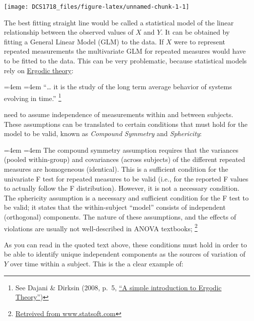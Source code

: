 \documentclass[12pt,]{book}
\let\rmarkdownfootnote\footnote%
\def\footnote{\protect\rmarkdownfootnote}
\renewenvironment{quote}{%
  \par \small \medskip \block
  \leftskip=4em \rightskip=4em%
  \noindent \ignorespaces}{%
  \par \medskip
  }
\theoremstyle{definition}
\theoremstyle{definition}
\theoremstyle{definition}
\theoremstyle{remark}
\begin{document}
\begin{center}\texttt{[image: DCS1718\_files/figure-latex/unnamed-chunk-1-1]} \end{center}

The best fitting straight line would be called a statistical model of
the linear relationship between the observed values of \(X\) and \(Y\).
It can be obtained by fitting a General Linear Model (GLM) to the data.
If \(X\) were to represent repeated measurements the multivariate GLM
for repeated measures would have to be fitted to the data. This can be
very problematic, because statistical models rely on
\href{https://en.wikipedia.org/wiki/Ergodic_theory}{Ergodic theory}:

\begin{quote}
``\ldots{} it is the study of the long term average behavior of systems
evolving in time.'' \footnote{See Dajani \& Dirksin (2008, p.~5,
  \href{http://www.staff.science.uu.nl/~kraai101/lecturenotes2009.pdf}{``A
  simple introduction to Ergodic Theory''})}
\end{quote}

need to assume independence of measurements within and between subjects.
These assumptions can be translated to certain conditions that must hold
for the model to be valid, known as \emph{Compound Symmetry} and
\emph{Sphericity}:

\begin{quote}
The compound symmetry assumption requires that the variances (pooled
within-group) and covariances (across subjects) of the different
repeated measures are homogeneous (identical). This is a sufficient
condition for the univariate F test for repeated measures to be valid
(i.e., for the reported F values to actually follow the F distribution).
However, it is not a necessary condition. The sphericity assumption is a
necessary and sufficient condition for the F test to be valid; it states
that the within-subject ``model'' consists of independent (orthogonal)
components. The nature of these assumptions, and the effects of
violations are usually not well-described in ANOVA textbooks; \footnote{\href{https://www.statsoft.com/Textbook/ANOVA-MANOVA\#sphericity}{Retreived
  from www.statsoft.com}}
\end{quote}

As you can read in the quoted text above, these conditions must hold in
order to be able to identify unique independent components as the
sources of variation of \(Y\) over time within a subject. This is the a
clear example of:
\end{document}
